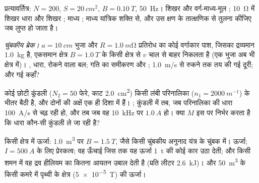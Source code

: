 \begin{exercise}[$\star\star$]\label{exo:b1:induction:6}
प्रत्यावर्तित्र: $N = 200$, $S = \qty{20}{cm^2}$, $B = \qty{0.10}{T}$, \qty{50}{Hz}।
शिखर और वर्ग-माध्य-मूल ; \qty{10}{\ohm} में शिखर धारा और
शिखर ; माध्य ; माध्य यांत्रिक शक्ति से, और उस क्षण के
तात्क्षणिक  से तुलना कीजिए जब  लुप्त हो जाता है।
\end{exercise}

\begin{exercise}[$\star\star$]\label{exo:b1:induction:7}
\emph{चुंबकीय ब्रेक।} $a = \qty{10}{cm}$ भुजा और
$R = \qty{1.0}{m\ohm}$ प्रतिरोध का कोई वर्गाकार पाश, जिसका द्रव्यमान
\qty{1.0}{kg} है, एकसमान क्षेत्र $B = \qty{1.0}{T}$ के किसी क्षेत्र से
$v$ चाल से बाहर निकलता है (एक भुजा अब भी क्षेत्र में)। ,
धारा, रोकने वाला बल; गति का समीकरण और ; \qty{1.0}{m/s} से रुकने तक तय
की गई दूरी; और  गई कहाँ?
\end{exercise}

\begin{exercise}[$\star\star$]\label{exo:b1:induction:8}
कोई छोटी कुंडली ($N_2 = 50$ फेरे, काट \qty{2.0}{cm^2}) किसी लंबी परिनालिका
($n_1 = \qty{2000}{m^{-1}}$) के भीतर बैठी है, और दोनों की अक्षें एक ही
दिशा में हैं। ; कुंडली में  तब, जब
परिनालिका की धारा \qty{100}{A/s} से चढ़ रही हो, और तब जब वह \qty{10}{kHz} पर
$\qty{1.0}{A}$ हो। क्या $M$ इस पर निर्भर करता है कि धारा कौन-सी कुंडली ले जा रही है?
\end{exercise}

\begin{exercise}[$\star\star$]\label{exo:b1:induction:9}
किसी क्षेत्र में ऊर्जा: \qty{1.0}{m^3} पर $B = \qty{1.5}{T}$, जैसे किसी
चुंबकीय अनुनाद यंत्र के चुंबक में। ऊर्जा; $I = \qty{500}{A}$ के लिए
प्रेरकत्व; वह ऊँचाई जिस तक यह ऊर्जा \qty{1}{t} की कोई कार उठा देती; और
किसी शमन में वह द्रव हीलियम का कितना आयतन उबाल देती है (प्रति लीटर
\qty{2.6}{kJ})। और \qty{50}{m^3} के किसी कमरे में पृथ्वी के क्षेत्र
(\qty{5e-5}{T}) की ऊर्जा।
\end{exercise}

